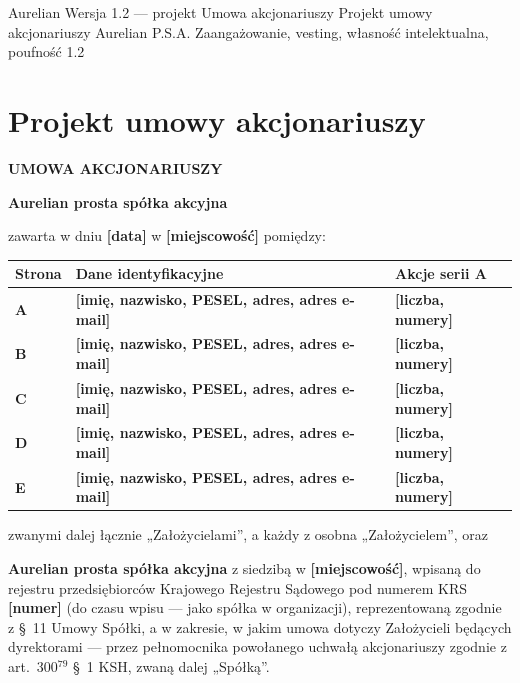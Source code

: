\documentclass[12pt,a4paper]{report}
\newcommand{\field}[1]{\textbf{[#1]}}
\newcommand{\CompanyFull}{Aurelian prosta spółka akcyjna}
\newcommand{\US}[1]{§~#1 Umowy Spółki}
\begin{document}
\BusinessPlanTitlePage
  {Aurelian}
  {Wersja 1.2 --- projekt}
  {Umowa akcjonariuszy}
  {Projekt umowy akcjonariuszy Aurelian P.S.A.}
  {Zaangażowanie, vesting, własność intelektualna, poufność}
  {1.2}

\tableofcontents
\newpage

\chapter*{Projekt umowy akcjonariuszy}

\begin{center}
{\Large\bfseries UMOWA AKCJONARIUSZY}\par
\vspace{0.25cm}
{\LARGE\bfseries \CompanyFull}\par
\vspace{0.6cm}
\end{center}

zawarta w dniu \field{data} w \field{miejscowość} pomiędzy:

\begin{center}
\begin{tabularx}{\textwidth}{>{\bfseries}p{1.6cm} >{\raggedright\arraybackslash}X >{\raggedright\arraybackslash}p{3.2cm}}
\toprule
Strona & Dane identyfikacyjne & Akcje serii A \\
\midrule
A & \field{imię, nazwisko, PESEL, adres, adres e-mail} & \field{liczba, numery} \\
B & \field{imię, nazwisko, PESEL, adres, adres e-mail} & \field{liczba, numery} \\
C & \field{imię, nazwisko, PESEL, adres, adres e-mail} & \field{liczba, numery} \\
D & \field{imię, nazwisko, PESEL, adres, adres e-mail} & \field{liczba, numery} \\
E & \field{imię, nazwisko, PESEL, adres, adres e-mail} & \field{liczba, numery} \\
\bottomrule
\end{tabularx}
\end{center}

zwanymi dalej łącznie „Założycielami”, a każdy z osobna „Założycielem”, oraz

\textbf{\CompanyFull} z siedzibą w \field{miejscowość}, wpisaną do rejestru przedsiębiorców Krajowego Rejestru Sądowego pod numerem KRS \field{numer} (do czasu wpisu --- jako spółka w organizacji), reprezentowaną zgodnie z \US{11}, a w zakresie, w jakim umowa dotyczy Założycieli będących dyrektorami --- przez pełnomocnika powołanego uchwałą akcjonariuszy zgodnie z art.~300$^{79}$ §~1 KSH, zwaną dalej „Spółką”.
\end{document}
